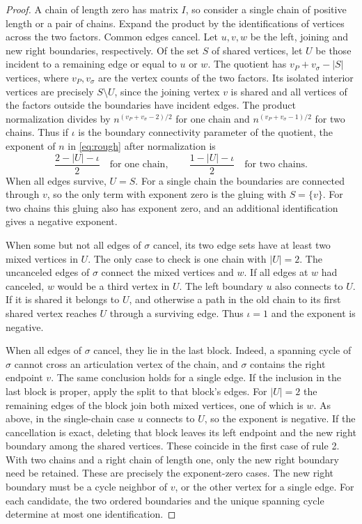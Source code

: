 \documentclass[11pt,letterpaper]{article}
\newcommand{\abs}[1]{\lvert #1\rvert}
\begin{document}
\begin{proof}
A chain of length zero has matrix \(I\), so consider a single chain
of positive length or a pair of chains. Expand the product by the
identifications of vertices across the two factors. Common edges
cancel. Let \(u,v,w\) be the left, joining and new right boundaries,
respectively. Of the set \(S\) of shared vertices, let \(U\) be those
incident to a remaining edge or equal to \(u\) or \(w\). The quotient
has \(v_P+v_\sigma-\abs S\) vertices, where \(v_P,v_\sigma\) are the
vertex counts of the two factors. Its isolated interior vertices
are precisely \(S\setminus U\), since the joining vertex \(v\) is
shared and all vertices of the factors outside the boundaries
have incident edges. The product normalization divides by
\(n^{(v_P+v_\sigma-2)/2}\) for one chain and
\(n^{(v_P+v_\sigma-1)/2}\) for two chains. Thus if \(\iota\) is the
boundary connectivity parameter of the quotient, the exponent of
\(n\) in \eqref{eq:rough} after normalization is
\[
 \frac{2-\abs U-\iota}{2}\quad\text{for one chain},\qquad
 \frac{1-\abs U-\iota}{2}\quad\text{for two chains}.
\]
When all edges survive, \(U=S\). For a single chain the boundaries
are connected through \(v\), so the only term with exponent zero is
the gluing with \(S=\{v\}\). For two chains this gluing also has
exponent zero, and an additional identification gives a negative
exponent.

When some but not all edges of \(\sigma\) cancel, its two edge sets
have at least two mixed vertices in \(U\). The only case to check is
one chain with \(\abs U=2\). The uncanceled edges of \(\sigma\) connect
the mixed vertices and \(w\). If all edges at \(w\) had canceled,
\(w\) would be a third vertex in \(U\). The left boundary \(u\) also
connects to \(U\). If it
is shared it belongs to \(U\), and otherwise a path in the old chain
to its first shared vertex reaches \(U\) through a surviving edge.
Thus \(\iota=1\) and the exponent is negative.

When all edges of \(\sigma\) cancel, they lie in the last block. Indeed,
a spanning cycle of \(\sigma\) cannot cross an articulation vertex of
the chain, and \(\sigma\) contains the right endpoint \(v\). The same
conclusion holds for a single edge. If the inclusion in the last block
is proper, apply the split to that block's edges. For \(\abs U=2\) the
remaining edges of the block join both mixed vertices, one of which is
\(w\). As above, in the single-chain case \(u\) connects to \(U\), so the
exponent is negative. If the cancellation is exact, deleting that
block leaves its left endpoint and the new right boundary among the
shared vertices. These coincide in the first case of rule 2. With two
chains and a right chain of length one, only the new right boundary
need be retained. These are precisely the exponent-zero cases.
The new right boundary must be a cycle neighbor of \(v\), or the
other vertex for a single edge. For each candidate, the two ordered
boundaries and the unique spanning cycle determine at most one
identification.


\end{proof}
\end{document}
